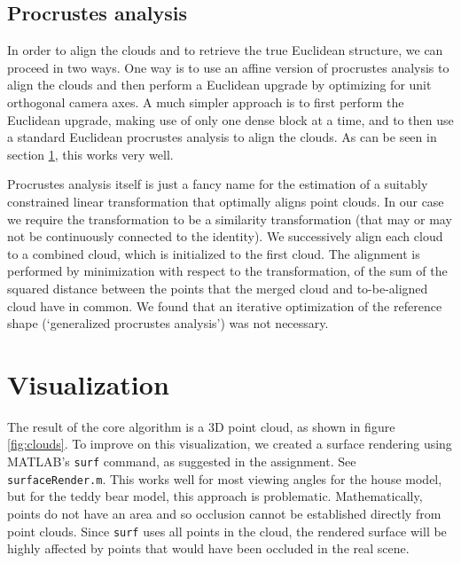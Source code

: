 \documentclass[a4paper,10pt]{article}
\begin{document}
\subsection{Procrustes analysis}

In order to align the clouds and to retrieve the true Euclidean structure, we can proceed in two ways.
One way is to use an affine version of procrustes analysis to align the clouds and then perform a Euclidean upgrade by optimizing for unit orthogonal camera axes.
A much simpler approach is to first perform the Euclidean upgrade, making use of only one dense block at a time, and to then use a standard Euclidean procrustes analysis to align the clouds.
As can be seen in section \ref{sec:vis}, this works very well.

Procrustes analysis itself is just a fancy name for the estimation of a suitably constrained linear transformation that optimally aligns point clouds.
In our case we require the transformation to be a similarity transformation (that may or may not be continuously connected to the identity).
We successively align each cloud to a combined cloud, which is initialized to the first cloud.
The alignment is performed by minimization with respect to the transformation, of the sum of the squared distance between the points that the merged cloud and to-be-aligned cloud have in common.
We found that an iterative optimization of the reference shape (`generalized procrustes analysis') was not necessary.

\section{Visualization}
\label{sec:vis}
The result of the core algorithm is a 3D point cloud, as shown in figure \ref{fig:clouds}.
To improve on this visualization, we created a surface rendering using MATLAB's \verb+surf+ command, as suggested in the assignment.
See \verb+surfaceRender.m+.
This works well for most viewing angles for the house model, but for the teddy bear model, this approach is problematic.
Mathematically, points do not have an area and so occlusion cannot be established directly from point clouds.
Since \verb+surf+ uses all points in the cloud, the rendered surface will be highly affected by points that would have been occluded in the real scene.
\end{document}
